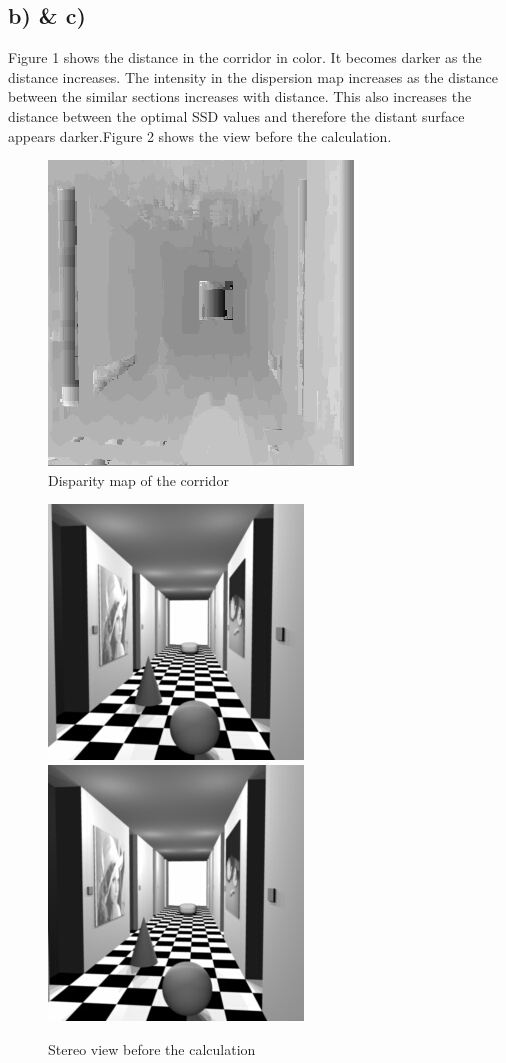 \documentclass{article}
\begin{document}
	\subsection{b) \& c)}
	Figure 1 shows the distance in the corridor in color. It becomes darker as the distance increases. 
	The intensity in the dispersion map increases as the distance between the similar sections increases with distance. This also increases the distance between the optimal SSD values and therefore the distant surface appears darker.Figure 2 shows the view before the calculation.
	\begin{figure}
		\center
		\caption{Disparity map of the corridor}
		\includegraphics{corridor_disp.png}
		
	\end{figure}
	\begin{figure}
		\center
		\caption{Stereo view before the calculation}
		\includegraphics[scale=0.4]{corridorl.jpg}
		\includegraphics[scale=0.4]{corridorr.jpg}
	\end{figure}
	
\end{document}
